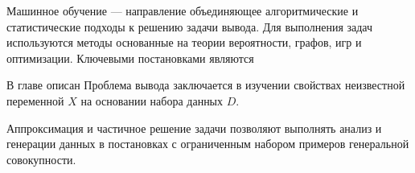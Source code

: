 Машинное обучение --- направление объединяющее алгоритмические и статистические подходы к решению задачи вывода.
Для выполнения задач используются методы основанные на теории вероятности, графов, игр и оптимизации. Ключевыми 
постановками являются

В главе описан 
Проблема вывода заключается в изучении свойствах неизвестной переменной $X$
на основании набора данных $D$.



Аппроксимация и частичное решение задачи позволяют выполнять анализ и генерации данных 
в постановках с ограниченным набором примеров генеральной совокупности.




